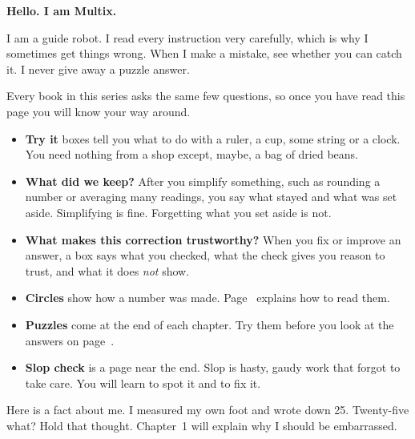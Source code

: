 {\sans\bfseries\LARGE\color{ink} Hello. I am Multix.}\par
\begin{multix}[wow]\multixbot[wow]\tcblower
I am a guide robot. I read every instruction very carefully, which is why I sometimes get things wrong.
When I make a mistake, see whether you can catch it. I never give away a puzzle answer.
\end{multix}

Every book in this series asks the same few questions, so once you have read this page you will know your way around.

\begin{itemize}[leftmargin=1.6em,itemsep=0.45em]
\item[\textcolor{leaf}{\ding{108}}] \textbf{Try it} boxes tell you what to do with a ruler, a cup, some string or a clock. You need nothing from a shop except, maybe, a bag of dried beans.
\item[\textcolor{sun!80!black}{\ding{108}}] \textbf{What did we keep?} After you simplify something, such as rounding a number or averaging many readings, you say what stayed and what was set aside. Simplifying is fine. Forgetting what you set aside is not.
\item[\textcolor{tangerine}{\ding{108}}] \textbf{What makes this correction trustworthy?} When you fix or improve an answer, a box says what you checked, what the check gives you reason to trust, and what it does \emph{not} show.
\item[\textcolor{sky}{\ding{108}}] \textbf{Circles} show how a number was made. Page~\pageref{circlecard} explains how to read them.
\item[\textcolor{grape}{\ding{108}}] \textbf{Puzzles} come at the end of each chapter. Try them before you look at the answers on page~\pageref{answers}.
\item[\textcolor{tomato}{\ding{108}}] \textbf{Slop check} is a page near the end. Slop is hasty, gaudy work that forgot to take care. You will learn to spot it and to fix it.
\end{itemize}

\begin{multix}[hmm]\multixbot[hmm]\tcblower
Here is a fact about me. I measured my own foot and wrote down 25. Twenty-five what? Hold that thought. Chapter~1 will explain why I should be embarrassed.
\end{multix}
\clearpage

